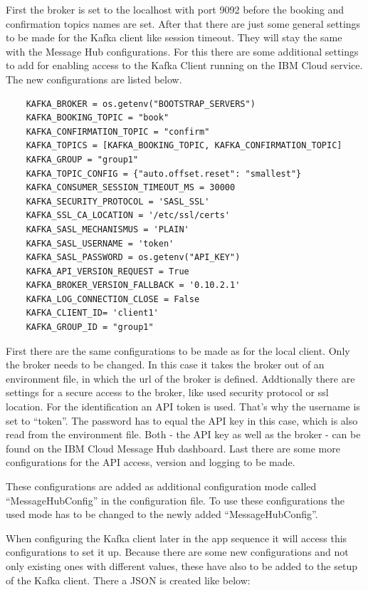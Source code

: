 First the broker is set to the localhost with port 9092 before the booking and confirmation topics names are set. After that there are just some general settings to be made for the Kafka client like session timeout. They will stay the same with the Message Hub configurations. For this there are some additional settings to add for enabling access to the Kafka Client running on the IBM Cloud service. The new configurations are listed below.

\begin{lstlisting}
    KAFKA_BROKER = os.getenv("BOOTSTRAP_SERVERS")
    KAFKA_BOOKING_TOPIC = "book"
    KAFKA_CONFIRMATION_TOPIC = "confirm"
    KAFKA_TOPICS = [KAFKA_BOOKING_TOPIC, KAFKA_CONFIRMATION_TOPIC]
    KAFKA_GROUP = "group1"
    KAFKA_TOPIC_CONFIG = {"auto.offset.reset": "smallest"}
    KAFKA_CONSUMER_SESSION_TIMEOUT_MS = 30000
    KAFKA_SECURITY_PROTOCOL = 'SASL_SSL'
    KAFKA_SSL_CA_LOCATION = '/etc/ssl/certs'
    KAFKA_SASL_MECHANISMUS = 'PLAIN'
    KAFKA_SASL_USERNAME = 'token'
    KAFKA_SASL_PASSWORD = os.getenv("API_KEY")
    KAFKA_API_VERSION_REQUEST = True
    KAFKA_BROKER_VERSION_FALLBACK = '0.10.2.1'
    KAFKA_LOG_CONNECTION_CLOSE = False
    KAFKA_CLIENT_ID= 'client1'
    KAFKA_GROUP_ID = "group1"
\end{lstlisting}

First there are the same configurations to be made as for the local client. Only the broker needs to be changed. In this case it takes the broker out of an environment file, in which the url of the broker is defined. Addtionally there are settings for a secure access to the broker, like used security protocol or ssl location. For the identification an API token is used. That's why the username is set to ``token''. The password has to equal the API key in this case, which is also read from the environment file. Both - the API key as well as the broker - can be found on the IBM Cloud Message Hub dashboard. Last there are some more configurations for the API access, version and logging to be made.

These configurations are added as additional configuration mode called ``MessageHubConfig'' in the configuration file. To use these configurations the used mode has to be changed to the newly added ``MessageHubConfig''.

When configuring the Kafka client later in the app sequence it will access this configurations to set it up. Because there are some new configurations and not only existing ones with different values, these have also to be added to the setup of the Kafka client. There a JSON is created like below:

